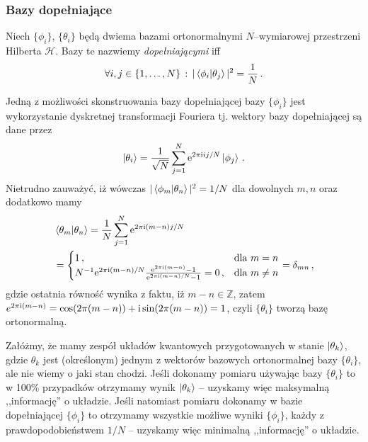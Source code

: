 \documentclass{myclass}
\begin{document}
\subsubsection*{Bazy dopełniające}
\begin{definition}
    Niech \(\{\phi_i\}\), \(\{\theta_i\}\)  będą dwiema bazami ortonormalnymi \(N\)--wymiarowej
    przestrzeni Hilberta \(\mathscr{H}\). Bazy te nazwiemy \textit{dopełniającymi} iff
    \begin{equation*}
        \forall i,j\in\{1,\ldots,N\}\,:\, |\braket{\phi_i}{\theta_j}|^2 = \frac{1}{N}\,.
    \end{equation*}
\end{definition}
Jedną z możliwości skonstruowania bazy dopełniającej bazy \(\{\phi_i\}\) jest wykorzystanie
dyskretnej transformacji Fouriera tj. wektory bazy dopełniającej są dane przez
\begin{equation*}
    \ket{\theta_i} = \frac{1}{\sqrt{N}}\sum_{j=1}^N \mathrm{e}^{2\pi\mathrm{i} ij/N}\ket{\phi_j}\,.
\end{equation*}
Nietrudno zauważyć, iż wówczas \(|\braket{\phi_m}{\theta_n}|^2 = 1/N\) dla dowolnych \(m, n\) oraz
dodatkowo mamy
\begin{equation*}
    \begin{split}
        &\braket{\theta_m}{\theta_n} = \frac{1}{N}\sum_{j=1}^N \mathrm{e}^{2\pi\mathrm{i}(m - n)j/N} \\
        &= \begin{cases}
            1\,,&\text{dla \(m=n\)}\\
            N^{-1}\mathrm{e}^{2\pi\mathrm{i}(m-n)/N}\frac{\mathrm{e}^{2\pi\mathrm{i}(m-n)} - 1}{\mathrm{e}^{2\pi\mathrm{i}(m-n)/N} - 1} = 0\,,&\text{dla \(m\neq n\)}
        \end{cases} = \delta_{mn}\,,
    \end{split}
\end{equation*}
gdzie ostatnia równość wynika z faktu, iż \(m-n\in\mathbb{Z}\), zatem \(e^{2\pi\mathrm{i}(m-n)} =
\cos(2\pi(m-n)) + \mathrm{i}\sin(2\pi(m-n)) = 1\), czyli \(\{\theta_i\}\) tworzą bazę ortonormalną.

Załóżmy, że mamy zespół układów kwantowych przygotowanych w stanie \(\ket{\theta_k}\), gdzie
\(\theta_k\) jest (określonym) jednym z wektorów bazowych ortonormalnej bazy \(\{\theta_i\}\), ale
nie wiemy o jaki stan chodzi. Jeśli dokonamy pomiaru używając bazy \(\{\theta_i\}\) to w 100\%
przypadków otrzymamy wynik \(\ket{\theta_k}\) -- uzyskamy więc maksymalną ,,informację'' o układzie.
Jeśli natomiast pomiaru dokonamy w bazie dopełniającej \(\{\phi_i\}\) to otrzymamy wszystkie możliwe
wyniki \(\{\phi_i\}\), każdy z prawdopodobieństwem \(1/N\) -- uzyskamy więc minimalną ,,informację''
o układzie.
\end{document}
